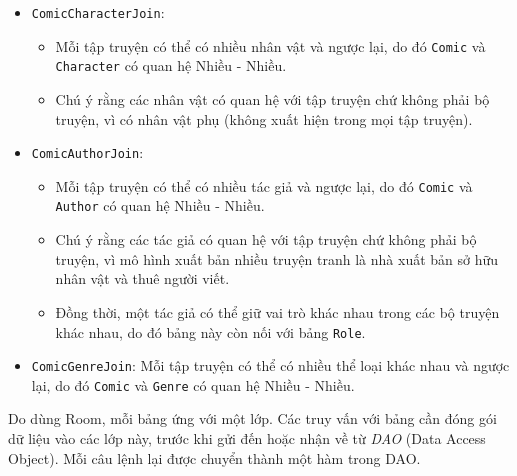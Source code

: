 \documentclass[../../../../thesis]{subfiles}
\begin{document}
\begin{itemize}
    \item
          \texttt{ComicCharacterJoin}:

          \begin{itemize}
              \item
                  Mỗi tập truyện có thể có nhiều nhân vật và ngược lại, do đó
                  \texttt{Comic} và \texttt{Character} có quan hệ Nhiều - Nhiều.
              \item
                  Chú ý rằng các nhân vật có quan hệ với tập truyện chứ không
                  phải bộ truyện, vì có nhân vật phụ (không xuất hiện trong mọi
                  tập truyện).
          \end{itemize}
    \item
          \texttt{ComicAuthorJoin}:

          \begin{itemize}
              \item
                  Mỗi tập truyện có thể có nhiều tác giả và ngược lại, do đó
                  \texttt{Comic} và \texttt{Author} có quan hệ Nhiều - Nhiều.
              \item
                  Chú ý rằng các tác giả có quan hệ với tập truyện chứ không
                  phải bộ truyện, vì mô hình xuất bản nhiều truyện tranh là nhà
                  xuất bản sở hữu nhân vật và thuê người viết.
              \item
                  Đồng thời, một tác giả có thể giữ vai trò khác nhau trong các
                  bộ truyện khác nhau, do đó bảng này còn nối với bảng
                  \texttt{Role}.
          \end{itemize}
\end{itemize}

\begin{itemize}[resume, before = \vspace*{-\dimexpr\topsep+\partopsep\relax}]
    \item
          \texttt{ComicGenreJoin}: Mỗi tập truyện có thể có nhiều thể loại khác
          nhau và ngược lại, do đó \texttt{Comic} và \texttt{Genre} có quan hệ
          Nhiều - Nhiều.
\end{itemize}

Do dùng Room, mỗi bảng ứng với một lớp. Các truy vấn với bảng cần đóng gói dữ
liệu vào các lớp này, trước khi gửi đến hoặc nhận về từ \emph{DAO} (Data Access
Object). Mỗi câu lệnh lại được chuyển thành một hàm trong DAO.
\end{document}
